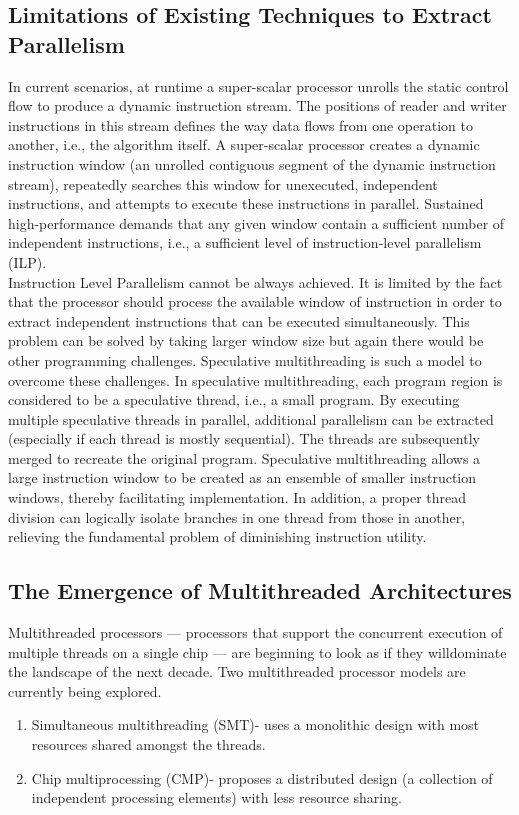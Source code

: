\documentclass[a4paper,12pt]{article}
\begin{document}
\subsection{Limitations of Existing Techniques to Extract Parallelism}
In current scenarios, at runtime a super-scalar processor unrolls the static control flow to produce a dynamic instruction stream. The positions of reader and writer instructions in this stream defines the way data flows from one operation to another, i.e., the algorithm itself. A super-scalar processor creates a dynamic instruction window (an unrolled contiguous segment of the dynamic instruction stream), repeatedly searches this window for unexecuted, independent instructions, and attempts to execute these instructions in parallel. Sustained high-performance demands that any given window contain a sufficient number of independent instructions, i.e., a sufficient level of instruction-level parallelism (ILP).
\\
Instruction Level Parallelism cannot be always achieved. It is limited by the fact that the processor should process the available window of instruction in order to extract independent instructions that can be executed simultaneously. This problem can be solved by taking larger window size but again there would be other programming challenges. Speculative multithreading is such a model to overcome these challenges. In speculative multithreading, each program region is considered to be a speculative thread, i.e., a small program. By executing multiple speculative threads in parallel, additional parallelism can be extracted (especially if each thread is mostly sequential). The threads are subsequently merged to recreate the original program. Speculative multithreading allows a large instruction window to be created as an ensemble of smaller instruction windows, thereby facilitating implementation. In addition, a proper thread division can logically isolate branches in one thread from those in another, relieving the fundamental problem of diminishing instruction utility.
\subsection{The Emergence of Multithreaded Architectures}
Multithreaded processors — processors that support the concurrent execution of multiple threads on a single chip — are beginning to look as if they willdominate the landscape of the next decade. Two multithreaded processor models are currently being explored.\cite{multithreaded}
\begin{enumerate}
\item Simultaneous multithreading (SMT)- uses a monolithic design with most resources shared amongst the threads.

\item Chip multiprocessing (CMP)- proposes a distributed design (a collection of independent processing elements) with less resource sharing.

\end{enumerate}
\end{document}
